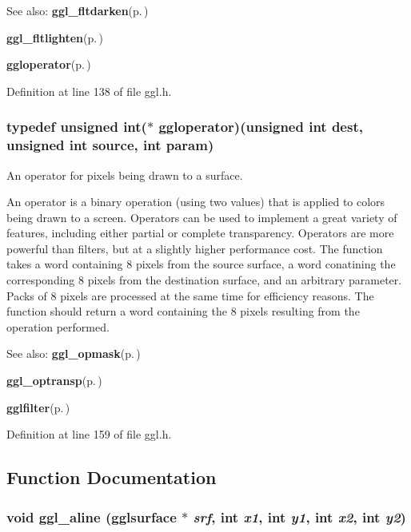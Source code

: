 \begin{Desc}
\item[See also:]{\bf ggl\_\-fltdarken}{\rm (p.\,\pageref{ggl_8h_a29})} 

{\bf ggl\_\-fltlighten}{\rm (p.\,\pageref{ggl_8h_a28})} 

{\bf ggloperator}{\rm (p.\,\pageref{ggl_8h_a8})} \end{Desc}


Definition at line 138 of file ggl.h.
\subsubsection{\setlength{\rightskip}{0pt plus 5cm}typedef unsigned int($\ast$ {\bf ggloperator})(unsigned int dest, unsigned int source, int param)}\label{ggl_8h_a8}


An operator for pixels being drawn to a surface. 

An operator is a binary operation (using two values) that is applied to colors being drawn to a screen. Operators can be used to implement a great variety of features, including either partial or complete transparency. Operators are more powerful than filters, but at a slightly higher performance cost. The function takes a word containing 8 pixels from the source surface, a word conatining the corresponding 8 pixels from the destination surface, and an arbitrary parameter. Packs of 8 pixels are processed at the same time for efficiency reasons. The function should return a word containing the 8 pixels resulting from the operation performed.

\begin{Desc}
\item[See also:]{\bf ggl\_\-opmask}{\rm (p.\,\pageref{ggl_8h_a30})} 

{\bf ggl\_\-optransp}{\rm (p.\,\pageref{ggl_8h_a31})} 

{\bf gglfilter}{\rm (p.\,\pageref{ggl_8h_a7})} \end{Desc}


Definition at line 159 of file ggl.h.

\subsection{Function Documentation}
\subsubsection{\setlength{\rightskip}{0pt plus 5cm}void ggl\_\-aline ({\bf gglsurface} $\ast$ {\em srf}, int {\em x1}, int {\em y1}, int {\em x2}, int {\em y2})}\label{ggl_8h_a35}


